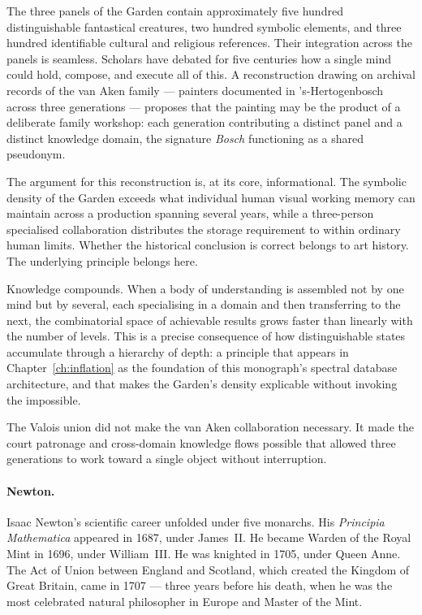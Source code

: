 The three panels of the Garden contain approximately five hundred
distinguishable fantastical creatures, two hundred symbolic elements,
and three hundred identifiable cultural and religious references.
Their integration across the panels is seamless.
Scholars have debated for five centuries how a single mind could hold,
compose, and execute all of this.
A reconstruction drawing on archival records of the van Aken family
--- painters documented in 's-Hertogenbosch across three generations ---
proposes that the painting may be the product of a deliberate family
workshop: each generation contributing a distinct panel and a distinct
knowledge domain, the signature \textit{Bosch} functioning as a shared
pseudonym.

The argument for this reconstruction is, at its core, informational.
The symbolic density of the Garden exceeds what individual human visual
working memory can maintain across a production spanning several years,
while a three-person specialised collaboration distributes the storage
requirement to within ordinary human limits.
Whether the historical conclusion is correct belongs to art history.
The underlying principle belongs here.

Knowledge compounds.
When a body of understanding is assembled not by one mind but by several,
each specialising in a domain and then transferring to the next, the
combinatorial space of achievable results grows faster than linearly with
the number of levels.
This is a precise consequence of how distinguishable states accumulate
through a hierarchy of depth: a principle that appears in
Chapter~\ref{ch:inflation} as the foundation of this monograph's spectral
database architecture, and that makes the Garden's density explicable
without invoking the impossible.

The Valois union did not make the van Aken collaboration necessary.
It made the court patronage and cross-domain knowledge flows possible that
allowed three generations to work toward a single object without
interruption.

\bigskip
\paragraph{Newton.}

Isaac Newton's scientific career unfolded under five monarchs.
His \textit{Principia Mathematica} appeared in 1687, under James~II.
He became Warden of the Royal Mint in 1696, under William~III.
He was knighted in 1705, under Queen Anne.
The Act of Union between England and Scotland, which created the Kingdom
of Great Britain, came in 1707 --- three years before his death, when he
was the most celebrated natural philosopher in Europe and Master of the
Mint.

